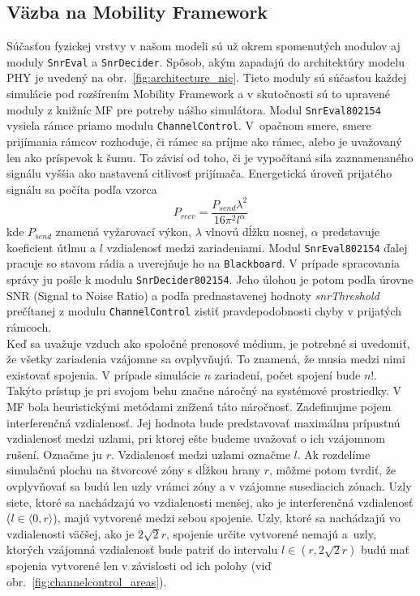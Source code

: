 \subsection{Väzba na Mobility Framework}
\indent\indent Súčasťou fyzickej vrstvy v našom modeli sú už okrem spomenutých modulov aj moduly \texttt{SnrEval} a \texttt{SnrDecider}. Spôsob, akým zapadajú do architektúry modelu PHY je uvedený na obr.~\ref{fig:architecture_nic}. Tieto moduly sú súčasťou každej simulácie pod rozšírením Mobility Framework a v skutočnosti sú to upravené moduly z knižníc MF pre potreby nášho simulátora. Modul \texttt{SnrEval802154} vysiela rámce priamo modulu \texttt{ChannelControl}. V~opačnom smere, smere prijímania rámcov rozhoduje, či rámec sa príjme ako rámec, alebo je uvažovaný len ako príspevok k šumu. To závisí od toho, či je vypočítaná sila zaznamenaného signálu vyššia ako nastavená citlivosť prijímača. Energetická úroveň prijatého signálu sa počíta podľa vzorca$$P_{recv}=\frac{P_{send}\lambda^{2}}{16\pi^{2}l^{\alpha}}$$ kde $P_{send}$ znamená vyžarovací výkon, $\lambda$ vlnovú dĺžku nosnej, $\alpha$ predstavuje koeficient útlmu a $l$ vzdialenosť medzi zariadeniami. Modul \texttt{SnrEval802154} ďalej pracuje so stavom rádia a uverejňuje ho na \texttt{Blackboard}. V prípade spracovania správy ju pošle k modulu \texttt{SnrDecider802154}. Jeho úlohou je potom podľa úrovne SNR (Signal to Noise Ratio) a podľa prednastavenej hodnoty \textit{snrThreshold} prečítanej z modulu \texttt{ChannelControl} zistiť pravdepodobnosti chyby v prijatých rámcoch.\\
\indent Keď sa uvažuje vzduch ako spoločné prenosové médium, je potrebné si uvedomiť, že všetky zariadenia vzájomne sa ovplyvňujú. To znamená, že musia medzi nimi existovať spojenia. V prípade simulácie $n$ zariadení, počet spojení bude $n!$. Takýto prístup je pri svojom behu značne náročný na systémové prostriedky. V MF bola heuristickými metódami znížená táto náročnosť. Zadefinujme pojem interferenčná vzdialenosť. Jej hodnota bude predstavovať maximálnu prípustnú vzdialenosť medzi uzlami, pri ktorej ešte budeme uvažovať o ich vzájomnom rušení. Označme ju $r$. Vzdialenosť medzi uzlami označme $l$. Ak rozdelíme simulačnú plochu na štvorcové zóny s dĺžkou hrany $r$, môžme potom tvrdiť, že ovplyvňovať sa budú len uzly vrámci zóny a v vzájomne susediacich zónach. Uzly siete, ktoré sa nachádzajú vo vzdialenosti menšej, ako je interferenčná vzdialenosť ($l\in\langle0,r\rangle$), majú vytvorené medzi sebou spojenie. Uzly, ktoré sa nachádzajú vo vzdialenosti väčšej, ako je $2\sqrt{2}r$, spojenie určite vytvorené nemajú a~uzly, ktorých vzájomná vzdialenosť bude patriť do intervalu $l\in(r, 2\sqrt{2}r)$ budú mať spojenia vytvorené len v závislosti od ich polohy (viď obr.~\ref{fig:channelcontrol_areas}).\\

